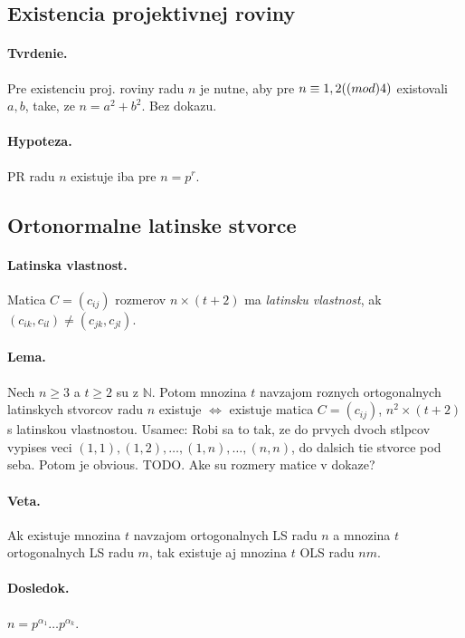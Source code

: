 \documentclass[10pt,a4paper]{article}
\begin{document}
\subsection{Existencia projektivnej roviny}
\paragraph{Tvrdenie.}
Pre existenciu proj. roviny radu $n$ je nutne, aby pre $n \equiv 1,2 (\textrm(mod) 4)$ existovali $a,b$, take, ze $n = a^2+b^2$. Bez dokazu. 

\paragraph{Hypoteza.}
PR radu $n$ existuje iba pre $n=p^r$. 

\subsection{Ortonormalne latinske stvorce}
\paragraph{Latinska vlastnost.}
Matica $C=(c_{ij})$ rozmerov $n \times (t+2)$ ma \emph{latinsku vlastnost}, ak $(c_{ik}, c_{il}) \neq (c_{jk}, c_{jl})$. 
\paragraph{Lema.}
Nech $n \geq 3$ a $t \geq 2$ su z $\mathbb{N}$. Potom mnozina $t$ navzajom roznych ortogonalnych
latinskych stvorcov radu $n$ existuje $\Leftrightarrow$ existuje matica $C=(c_{ij})$, $n^2\times (t+2)$ s latinskou vlastnostou.
Usamec: Robi sa to tak, ze do prvych dvoch stlpcov vypises veci $(1,1), (1, 2), \dots, (1, n),
\dots, (n,n)$, do dalsich tie stvorce pod seba. Potom je obvious.
TODO. Ake su rozmery matice v dokaze? 

\paragraph{Veta.}
Ak existuje mnozina $t$ navzajom ortogonalnych LS radu $n$ a mnozina $t$ ortogonalnych LS radu $m$, tak existuje aj mnozina $t$ OLS radu $nm$.

\paragraph{Dosledok.} $n = p^{\alpha_1} \ldots p^{\alpha_k}$.
\end{document}
